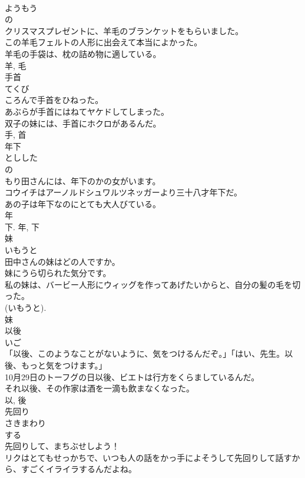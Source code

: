 \documentclass[8pt]{extreport}
\begin{document}
\begin{CJK}{UTF8}{min}
\\	ようもう	
\\	の 
\\	クリスマスプレゼントに、羊毛のブランケットをもらいました。	
\\	この羊毛フェルトの人形に出会えて本当によかった。	
\\	羊毛の手袋は、枕の詰め物に適している。	
\\	羊, 毛	
\\	手首	
\\	てくび	
\\	ころんで手首をひねった。	
\\	あぶらが手首にはねてヤケドしてしまった。	
\\	双子の妹には、手首にホクロがあるんだ。	
\\	手, 首	
\\	年下	
\\	としした	
\\	の 
\\	もり田さんには、年下のかの女がいます。	
\\	コウイチはアーノルドシュワルツネッガーより三十八才年下だ。	
\\	あの子は年下なのにとても大人びている。	
\\	年 
\\	下.	年, 下	
\\	妹	
\\	いもうと	
\\	田中さんの妹はどの人ですか。	
\\	妹にうら切られた気分です。	
\\	私の妹は、バービー人形にウィッグを作ってあげたいからと、自分の髪の毛を切った。	
\\	(いもうと). 
\\	妹	
\\	以後	
\\	いご	
\\	「以後、このようなことがないように、気をつけるんだぞ。」「はい、先生。以後、もっと気をつけます。」	
\\	10月29日のトーフグの日以後、ビエトは行方をくらましているんだ。	
\\	それ以後、その作家は酒を一滴も飲まなくなった。	
\\	以, 後	
\\	先回り	
\\	さきまわり	
\\	する 
\\	先回りして、まちぶせしよう！	
\\	リクはとてもせっかちで、いつも人の話をかっ手によそうして先回りして話すから、すごくイライラするんだよね。	

\end{CJK}
\end{document}
